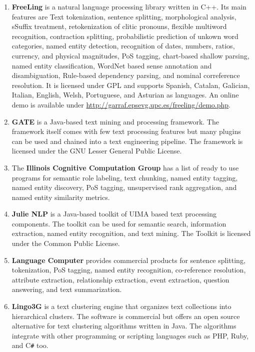 \documentclass[a4paper,twoside]{book}      %
\begin{document}
\begin{enumerate}
\item \textbf{FreeLing} \cite{atserias2006freeling} is a natural language processing library written in C++. Its main features are Text tokenization, sentence splitting, morphological analysis, sSuffix treatment, retokenization of clitic pronouns, flexible multiword recognition, contraction splitting, probabilistic prediction of unkown word categories, named entity detection, recognition of dates, numbers, ratios, currency, and physical magnitudes, PoS tagging, chart-based shallow parsing, named entity classification,  WordNet based sense annotation and disambiguation, Rule-based dependency parsing, and nominal correference resolution.
It is licensed under GPL and supports Spanish, Catalan, Galician, Italian, English, Welsh, Portuguese, and Asturian as languages. An online demo is available under \url{http://garraf.epsevg.upc.es/freeling/demo.php}.
\item \textbf{GATE} \cite{cunningham2002gate} is a Java-based text mining and processing framework. The framework itself comes with few text processing features but many plugins can be used and chained into a text engineering pipeline.
The framework is licensed under the GNU Lesser General Public License.
\item The \textbf{Illinois Cognitive Computation Group} \cite{illinoisccg} has a list of ready to use programs for semantic role labeling, text chunking, named entity tagging, named entity discovery, PoS tagging, unsupervised rank aggregation, and named entity similarity metrics.
\item \textbf{Julie NLP} \cite{tomanek2007uima,hahn2008overview} is a Java-based toolkit of UIMA based text processing components. The toolkit can be used for semantic search, information extraction, named entity recognition, and text mining.
The Toolkit is licensed under the Common Public License.
\item \textbf{Language Computer} \cite{lanuagecomputer} provides commercial products for sentence splitting, tokenization, PoS tagging, named entity recognition, co-reference resolution, attribute extraction, relationship extraction, event extraction, question answering, and text summarization.
\item \textbf{Lingo3G} \cite{lingo3g} is a text clustering engine that organizes text collections into hierarchical clusters.
The software is commercial but \cite{stefanowski2003carrot} offers an open source alternative for text clustering algorithms written in Java. The algorithms integrate with other programming or scripting languages such as PHP, Ruby, and C\verb$#$ too.

\end{enumerate}
\end{document}
